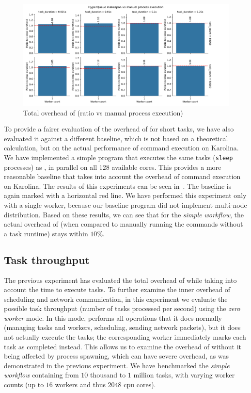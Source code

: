 \begin{figure}[h]
	\centering
	\includegraphics[width=\textwidth]{imgs/hq/charts/total-overhead-vs-manual}
	\caption{Total overhead of \hyperqueue{} (ratio vs manual process execution)}
	\label{fig:hq-overhead-vs-manual}
\end{figure}

To provide a fairer evaluation of the overhead of \hyperqueue{} for short tasks, we have
also evaluated it against a different baseline, which is not based on a theoretical calculation,
but on the actual performance of command execution on Karolina. We have implemented a simple
program that executes the same tasks (\texttt{sleep} processes) as
\hyperqueue{}, in parallel on all $128$ available cores. This provides a
more reasonable baseline that takes into account the overhead of command execution on Karolina. The
results of this experiments can be seen in~. The baseline is again marked
with a horizontal red line. We have performed this experiment only with a single worker, because
our baseline program did not implement multi-node distribution. Based on these results, we can see
that for the \emph{simple workflow}, the actual overhead of \hyperqueue{} (when compared to manually running the commands without a task runtime) stays within
$10\%$.

\subsection{Task throughput}
\label{sec:hq-exp-task-throughput}
The previous experiment has evaluated the total overhead of \hyperqueue{} while taking
into account the time to execute tasks. To further examine the inner overhead of scheduling and
network communication, in this experiment we evaluate the possible task throughput (number of tasks
processed per second) using the \emph{zero worker} mode. In this mode, \hq{}
performs all operations that it does normally (managing tasks and workers, scheduling, sending
network packets), but it does not actually execute the tasks; the corresponding worker immediately
marks each task as completed instead. This allows us to examine the overhead of
\hyperqueue{} without it being affected by process spawning, which can have severe
overhead, as was demonstrated in the previous experiment. We have benchmarked the
\emph{simple workflow} containing from $10$ thousand to $1$
million tasks, with varying worker counts (up to $16$ workers and thus
$2048$ \gls{cpu} cores).

